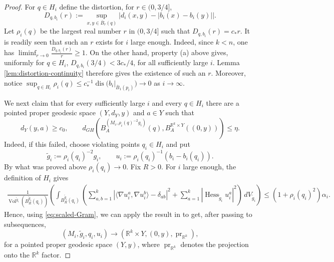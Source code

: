 \documentclass[11pt]{amsart}
\theoremstyle{definition}
\theoremstyle{remark}
\DeclareMathOperator{\Hess}{Hess}
\DeclareMathOperator{\Vol}{Vol}
\newcommand{\R}{\mathbb R}
\begin{document}
\begin{proof}
For $q\in H_i$ define the distortion, for $r\in (0,3/4]$,
\[
 D_{q,b_i}(r):=
 \sup_{x,y\in\overline B_r(q)}
 \left|d_i(x,y)-|b_i(x)-b_i(y)|\right|.
\]
Let $\rho_i(q)$ be the largest real number $r$ in $(0,3/4]$ such that $D_{q,b_i}(r)=c_*r$.
It is readily seen that such an $r$ exists for $i$ large enough. Indeed, since $k<n$, one has $\liminf_{r\to 0}\frac{D_{q,b_i}(r)}r\geq1$. On the other hand, property \textup{(a)} above
gives, uniformly for $q\in H_i$, $
                     D_{q,b_i}(3/4)<3c_*/4$, 
for all sufficiently large $i$.  Lemma \ref{lem:distortion-continuity}
therefore gives the existence of such an $r$. Moreover, notice
$ \sup_{q\in H_i}\rho_i(q)
 \leq c_*^{-1}\operatorname{dis}
       \bigl(b_i|_{\overline B_1(p_i)}\bigr)
 \to 0$ as $i\to \infty$.

We next claim that for every sufficiently large $i$ and every $q\in H_i$ there are a pointed proper geodesic space $(Y,d_Y,y)$ and
$a\in Y$ such that
\begin{equation}\label{eq:individual-product}
 d_Y(y,a)\geq c_0,
 \qquad
 d_{GH}\!\left(
 B_A^{(M_i,\rho_i(q)^{-2}g_i)}(q),
 B_A^{\mathbb R^k\times Y}((0,y))
 \right)\leq\eta.
\end{equation}
Indeed, if this failed, choose violating points $q_i\in H_i$ and put
\[
 \widetilde g_i:=\rho_i(q_i)^{-2}g_i,
 \qquad u_i:=\rho_i(q_i)^{-1}(b_i-b_i(q_i)).
\]
By what was proved above $\rho_i(q_i)\to0$.  Fix $R>0$.
For $i$ large enough, the definition of $H_i$ gives
\begin{align}
 \frac{1}{\Vol^{\widetilde g_i}(B_R^{\widetilde g_i}(q_i))}\left(\int_{B_R^{\widetilde g_i}(q_i)}
 \left(\sum_{a,b=1}^k
 \left|\langle\nabla u_i^a,\nabla u_i^b\rangle-\delta_{ab}\right|^2 + 
 \sum_{a=1}^k|\Hess_{\widetilde g_i}u_i^a|^2\right)
 \,dV_{\widetilde g_i}\right)
 \leq (1+\rho_i(q_i)^2)\alpha_i.\label{eq:scaled-Gram}
\end{align}
Hence, using \eqref{eq:scaled-Gram}, we can apply the result in \cite[Lemma 2.1]{KapovitchWilking} to get, after passing to subsequences,
\begin{equation}\label{eq:critical-product-limit}
 (M_i,\widetilde g_i,q_i,u_i)
 \longrightarrow
 (\mathbb R^k\times Y,(0,y),\operatorname{pr}_{\mathbb R^k}),
\end{equation}
for a pointed proper geodesic space $(Y,y)$, where $\operatorname{pr}_{\mathbb R^k}$ denotes the projection onto the $\R^k$ factor.


\end{proof}
\end{document}
